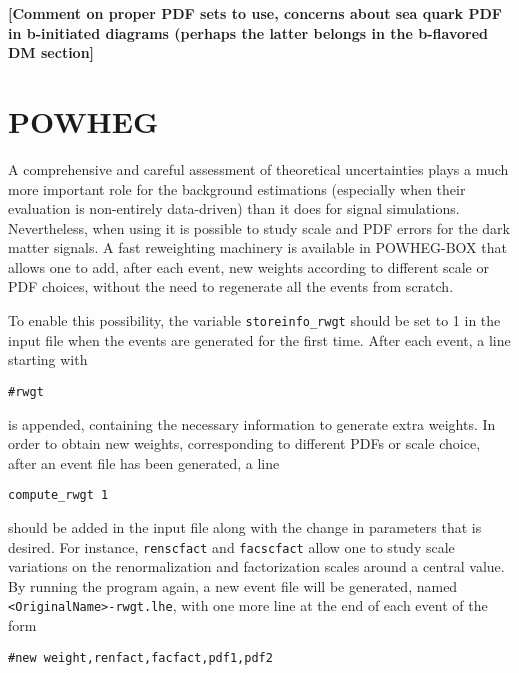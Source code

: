 

{\bf [Comment on proper PDF sets to use, concerns about sea quark PDF in b-initiated diagrams (perhaps the latter belongs in the b-flavored DM section]}

\section{POWHEG}

A comprehensive and careful assessment of theoretical uncertainties
plays a much more important role for the background estimations
(especially when their evaluation is non-entirely data-driven) than it
does for signal simulations. Nevertheless, when using \powheg it is
possible to study scale and PDF errors for the dark matter signals. A
fast reweighting machinery is available in {\sc POWHEG-BOX} that
allows one to add, after each event, new weights according to
different scale or PDF choices, without the need to regenerate all the
events from scratch. 

To enable this possibility, the variable \texttt{storeinfo\_rwgt} should be set 
to 1 in the \powheg input file when the events are generated for the 
first time. After each event, a line starting with 

\begin{verbatim}
#rwgt 
\end{verbatim}

is appended, containing the necessary information to generate extra 
weights. In order to obtain new weights, corresponding to different 
PDFs or scale choice, after an event file has been generated, a line 

\begin{verbatim}
compute_rwgt 1 
\end{verbatim}
should be added in the input file along with the change in parameters
that is desired. For instance, \texttt{renscfact} and
\texttt{facscfact} allow one to study scale variations on the
renormalization and factorization scales around a central value. By
running the program again, a new event file will be generated, named
\texttt{<OriginalName>-rwgt.lhe}, with one more line at the end of each event of the form

\begin{verbatim}
#new weight,renfact,facfact,pdf1,pdf2 
\end{verbatim}

